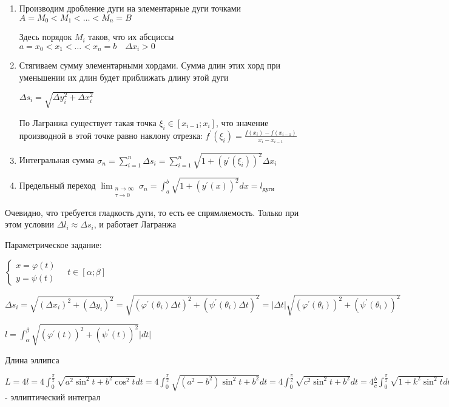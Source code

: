 \documentclass[12pt]{article}
\begin{document}
    \begin{enumerate}
        \item Производим дробление дуги на элементарные дуги точками $A = M_0 < M_1 < \dots < M_n = B$

        Здесь порядок $M_i$ таков, что их абсциссы $a = x_0 < x_1 < \dots < x_n = b \quad \Delta x_i > 0$

        \item Стягиваем сумму элементарными хордами. Сумма длин этих хорд при уменьшении их длин будет приближать длину этой дуги

        $\Delta s_i = \sqrt{\Delta y^2_i + \Delta x_i^2}$

        По \Ths Лагранжа существует такая точка $\xi_i \in [x_{i-1};x_i]$,
        что значение производной в этой точке равно наклону отрезка: $f^\prime(\xi_i) = \frac{f(x_i) - f(x_{i-1})}{x_i - x_{i-1}}$

        \item Интегральная сумма $\sigma_n = \sum_{i=1}^n \Delta s_i = \sum_{i=1}^n \sqrt{1 + (y^\prime(\xi_i))^2} \Delta x_i$

        \item Предельный переход $\lim_{\substack{n\to\infty \\ \tau \to 0}} \sigma_n = \int_a^b \sqrt{1 + (y^\prime(x))^2} dx = l_\text{дуги}$
    \end{enumerate}

    \Nota Очевидно, что требуется гладкость дуги, то есть ее спрямляемость. Только при этом условии $\Delta l_i \approx \Delta s_i$, и работает \Ths Лагранжа

    Параметрическое задание:

    $\begin{cases}x = \varphi(t) \\ y = \psi(t)\end{cases} \quad t \in [\alpha;\beta]$

    $\Delta s_i = \sqrt{(\Delta x_i)^2 + (\Delta y_i)^2} = \sqrt{(\varphi^\prime(\theta_i) \Delta t)^2 + (\psi^\prime(\theta_i) \Delta t)^2} =
    |\Delta t|\sqrt{(\varphi^\prime(\theta_i))^2 + (\psi^\prime(\theta_i))^2}$

    $l = \int^\beta_\alpha \sqrt{(\varphi^\prime(t))^2 + (\psi^\prime(t))^2} |dt|$

    \Ex Длина эллипса

    $L = 4l = 4 \int^\frac{\pi}{2}_0 \sqrt{a^2 \sin^2 t + b^2 \cos^2 t} dt =
    4 \int^\frac{\pi}{2}_0 \sqrt{(a^2 - b^2) \sin^2 t + b^2} dt =
    4 \int^\frac{\pi}{2}_0 \sqrt{c^2 \sin^2 t + b^2} dt = 4 \frac{b}{c} \int^\frac{\pi}{2}_0 \sqrt{1 + k^2 \sin^2 t} dt$ - эллиптический интеграл
\end{document}

